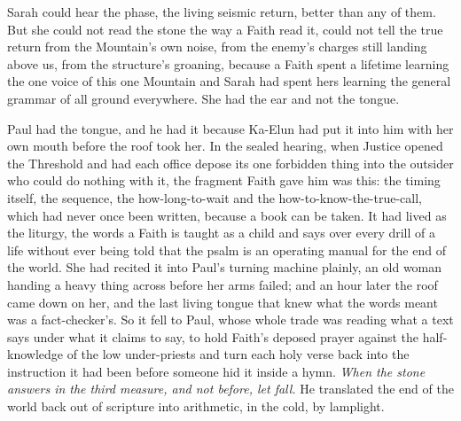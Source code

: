 Sarah could hear the phase, the living seismic return, better than any of them. But she could not read the stone the way a Faith read it, could not tell the true return from the Mountain's own noise, from the enemy's charges still landing above us, from the structure's groaning, because a Faith spent a lifetime learning the one voice of this one Mountain and Sarah had spent hers learning the general grammar of all ground everywhere. She had the ear and not the tongue.\par

Paul had the tongue, and he had it because Ka-Elun had put it into him with her own mouth before the roof took her. In the sealed hearing, when Justice opened the Threshold and had each office depose its one forbidden thing into the outsider who could do nothing with it, the fragment Faith gave him was this: the timing itself, the sequence, the how-long-to-wait and the how-to-know-the-true-call, which had never once been written, because a book can be taken. It had lived as the liturgy, the words a Faith is taught as a child and says over every drill of a life without ever being told that the psalm is an operating manual for the end of the world. She had recited it into Paul's turning machine plainly, an old woman handing a heavy thing across before her arms failed; and an hour later the roof came down on her, and the last living tongue that knew what the words meant was a fact-checker's. So it fell to Paul, whose whole trade was reading what a text says under what it claims to say, to hold Faith's deposed prayer against the half-knowledge of the low under-priests and turn each holy verse back into the instruction it had been before someone hid it inside a hymn. \emph{When the stone answers in the third measure, and not before, let fall.} He translated the end of the world back out of scripture into arithmetic, in the cold, by lamplight.\par

